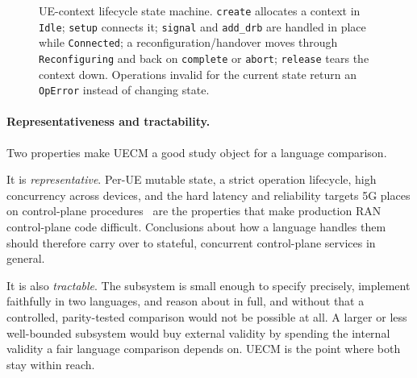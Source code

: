 \documentclass[english,twoside,openright,a4paper,censored,csm,software-track-2020]{HYthesisML}
\begin{document}
\begin{figure}
\centering
{}
\caption[UE-context lifecycle state machine]{UE-context lifecycle state machine. \texttt{create} allocates a context in
\texttt{Idle}; \texttt{setup} connects it; \texttt{signal} and \texttt{add\_drb} are handled
in place while \texttt{Connected}; a reconfiguration/handover moves through
\texttt{Reconfiguring} and back on \texttt{complete} or \texttt{abort}; \texttt{release}
tears the context down. Operations invalid for the current state return an \texttt{OpError}
instead of changing state.\label{fig:fsm}}
\end{figure}

\paragraph{Representativeness and tractability.}
Two properties make UECM a good study object for a language comparison.

It is \emph{representative}. Per-UE mutable state, a strict operation lifecycle, high concurrency
across devices, and the hard latency and reliability targets 5G places on control-plane
procedures~\cite{3gpp22261} are the properties that make production RAN control-plane code
difficult. Conclusions about how a language handles them should therefore carry over to stateful,
concurrent control-plane services in general.

It is also \emph{tractable}. The subsystem is small enough to specify precisely, implement
faithfully in two languages, and reason about in full, and without that a controlled,
parity-tested comparison would not be possible at all. A larger or less well-bounded subsystem
would buy
external validity by spending the internal validity a fair language comparison depends on. UECM
is the point where both stay within reach.
\end{document}
